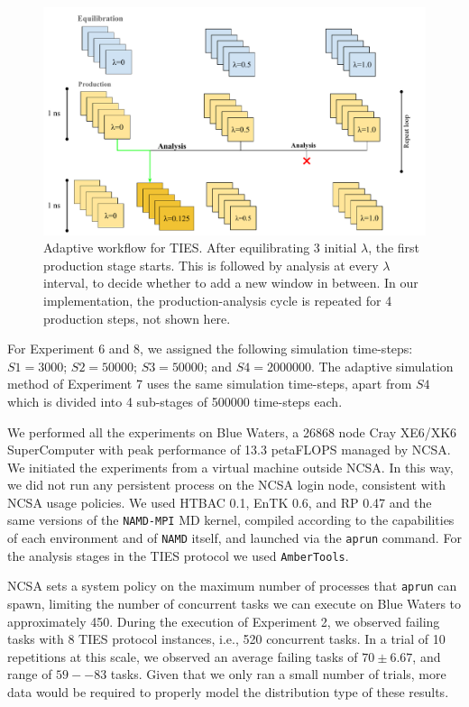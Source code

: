 \begin{figure}
  \centering
  \includegraphics[width=\columnwidth]{figures/Adaptive_TIES.pdf}
  \caption{Adaptive workflow for TIES. After equilibrating 3 initial
  $\lambda$, the first production stage starts. This is followed by analysis
  at every $\lambda$ interval, to decide whether to add a new window in
  between. In our implementation, the production-analysis cycle is repeated
  for 4 production steps, not shown here.}
\label{fig:adaptive_TIES}
\end{figure}

For Experiment 6 and 8, we assigned the following simulation time-steps:
$S1=3000$; $S2=50000$; $S3=50000$; and $S4=2000000$. The adaptive simulation
method of Experiment 7 uses the same simulation time-steps, apart from $S4$
which is divided into 4 sub-stages of 500000 time-steps each. 

We performed all the experiments on Blue Waters, a 26868 node Cray XE6/XK6
SuperComputer with peak performance of 13.3 petaFLOPS managed by NCSA. We
initiated the experiments from a virtual machine outside NCSA. In this way,
we did not run any persistent process on the NCSA login node, consistent with
NCSA usage policies. We used HTBAC 0.1, EnTK 0.6, and RP 0.47 and the same
versions of the \texttt{NAMD-MPI} MD kernel, compiled according to the
capabilities of each environment and of \texttt{NAMD} itself, and launched
via the \texttt{aprun} command. For the analysis stages in the TIES protocol
we used \texttt{AmberTools}.

NCSA sets a system policy on the maximum number of processes that
\texttt{aprun} can spawn, limiting the number of concurrent tasks we can
execute on Blue Waters to approximately 450. During the execution of
Experiment 2, we observed failing tasks with 8 TIES protocol instances, i.e.,
520 concurrent tasks. In a trial of 10 repetitions at this scale, we observed
an average failing tasks of $70\pm6.67$, and range of $59--83$ tasks. Given
that we only ran a small number of trials, more data would be required to
properly model the distribution type of these results.

